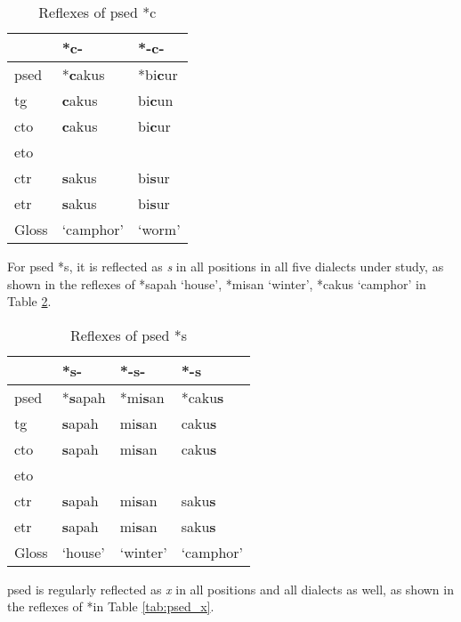 \begin{table}[!htbp]
\centering
\caption{Reflexes of \acl{psed} *c}
\label{tab:psed_c}
\begin{tabular}{lll}
\hline
           & *c-       & *-c-   \\ \hline
\acs{psed} & *\textbf{c}akus    & *bi\textbf{c}ur \\ \hdashline
\acs{tg}   & \textbf{c}akus     & bi\textbf{c}un  \\
\acs{cto}  & \textbf{c}akus     & bi\textbf{c}ur  \\
\acs{eto}  &           &        \\
\acs{ctr}  & \textbf{s}akus     & bi\textbf{s}ur  \\
\acs{etr}  & \textbf{s}akus     & bi\textbf{s}ur  \\ \hline
Gloss      & `camphor' & `worm' \\ \hline
\end{tabular}
\end{table}

For \acl{psed} *s, it is reflected as \textit{s} in all positions in all five dialects under study, as shown in the reflexes of *sapah `house', *misan `winter', *cakus `camphor' in Table \ref{tab:psed_s}.

\begin{table}[!htbp]
\centering
\caption{Reflexes of \acl{psed} *s}
\label{tab:psed_s}
\begin{tabular}{llll}
\hline
           & *s-     & *-s-     & *-s       \\ \hline
\acs{psed} & *\textbf{s}apah  & *mi\textbf{s}an   & *caku\textbf{s}    \\ \hdashline
\acs{tg}   & \textbf{s}apah   & mi\textbf{s}an    & caku\textbf{s}     \\
\acs{cto}  & \textbf{s}apah   & mi\textbf{s}an    & caku\textbf{s}     \\
\acs{eto}  &         &          &           \\
\acs{ctr}  & \textbf{s}apah   & mi\textbf{s}an    & saku\textbf{s}     \\
\acs{etr}  & \textbf{s}apah   & mi\textbf{s}an    & saku\textbf{s}     \\ \hline
Gloss      & `house' & `winter' & `camphor' \\ \hline
\end{tabular}
\end{table}

\acl{psed} is regularly reflected as \textit{x} in all positions and all dialects as well, as shown in the reflexes of *in Table \ref{tab:psed_x}. 

